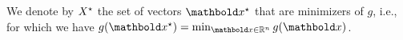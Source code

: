 \documentclass{tufte-handout}
\begin{document}

We denote by $X^\star$ the set of vectors $\vx^\star$ that are minimizers of $g$, i.e., for which we have $g(\vx^\star) = \min_{\vx\in\R^n} g(\vx)$.
\end{document}
